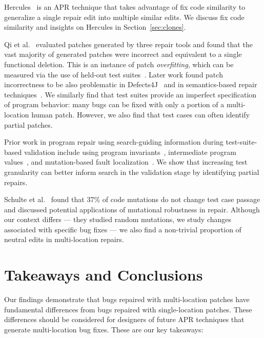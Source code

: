 \documentclass[10pt,journal,compsoc]{IEEEtran}
\begin{document}
Hercules~\cite{saha2019harnessing} is an APR technique that takes advantage of
fix code similarity to generalize a single repair edit into multiple similar
edits. We discuss fix code similarity and insights on Hercules in
Section~\ref{sec:clones}.

Qi et al.~\cite{patch-correctness} evaluated patches generated by three repair
tools and found that the vast majority of generated patches were incorrect and
equivalent to a single functional deletion. This is an instance of patch
\emph{overfitting}, which can be measured via the use of held-out test
suites~\cite{Smith15fse}. Later work found patch incorrectness to be also
problematic in Defects4J~\cite{d4j-eval} and in semantics-based repair
techniques~\cite{Le2018}. We similarly find that test suites provide an
imperfect specification of program behavior: many bugs can be fixed with only a
portion of a multi-location human patch. However, we also find that test cases
can often identify partial patches.

Prior work in program repair using search-guiding information during
test-suite-based validation include using program
invariants~\cite{better-fitness, dinglyu}, intermediate program
values~\cite{source-code-checkpoint}, and mutation-based fault
localization~\cite{mut-analysis}.
We show that increasing test granularity can better inform search in the
validation stage by identifying partial repairs.

Schulte et al.~\cite{schulte} found that 37\% of code mutations do not change
test case passage and discussed potential applications of mutational robustness
in repair.  Although our context differs --- they studied random
mutations, we study changes associated with specific bug fixes --- we also find
a non-trivial proportion of neutral edits in multi-location repairs.


\section{Takeaways and Conclusions}
\label{sec:takeaways}

Our findings demonstrate that bugs repaired with multi-location patches have
fundamental differences from bugs repaired with single-location patches. These
differences should be considered for designers of future APR techniques that
generate multi-location bug fixes. These are our key takeaways:
\end{document}
